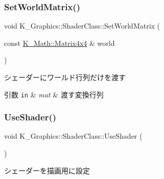 \subsubsection{\texorpdfstring{Set\+World\+Matrix()}{SetWorldMatrix()}}
{\footnotesize\ttfamily void K\+\_\+\+Graphics\+::\+Shader\+Class\+::\+Set\+World\+Matrix (\begin{DoxyParamCaption}\item[{const \mbox{\hyperlink{namespace_k___math_a345271af9d32dff2c964bc679b13b45c}{K\+\_\+\+Math\+::\+Matrix4x4}} \&}]{world }\end{DoxyParamCaption})}



シェーダーにワールド行列だけを渡す 


\begin{DoxyParams}[1]{引数}
\mbox{\tt in}  & {\em mat} & 渡す変換行列 \\
\hline
\end{DoxyParams}
\mbox{\label{class_k___graphics_1_1_shader_class_a53590f2a34bbf3f1dc91398068f43754}} 
\subsubsection{\texorpdfstring{Use\+Shader()}{UseShader()}}
{\footnotesize\ttfamily void K\+\_\+\+Graphics\+::\+Shader\+Class\+::\+Use\+Shader (\begin{DoxyParamCaption}{ }\end{DoxyParamCaption})}



シェーダーを描画用に設定 

